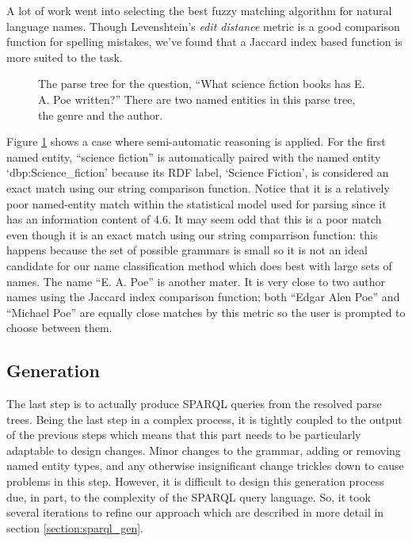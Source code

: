\documentclass[11pt]{article}
\begin{document}
{A lot of work went into selecting the best fuzzy matching algorithm for
natural language names. Though Levenshtein's {\em edit distance} metric
is a good comparison function for spelling mistakes, we've found that
a Jaccard index based function is more suited to the task. 

\begin{figure}[h!]
\caption{The parse tree for the question, 
``What science fiction books has E. A. Poe written?''
There are two named entities in this parse tree, the genre and the author.}
\label{fig:resolve}
\end{figure}

Figure \ref{fig:resolve} shows a case where semi-automatic reasoning is applied.
For the first named entity, ``science fiction'' is automatically paired with the
named entity `dbp:Science\_fiction' because its RDF label, `Science Fiction', is 
considered an exact match using our string comparison function. 
Notice that it is a relatively poor named-entity match within the statistical model
used for parsing since it has an information content of 4.6. It may seem odd that this
is a poor match even though it is an exact match using our string comparrison function:
this happens because the set of possible grammars is small so it is not an ideal
candidate for our name classification method which does best with large sets of names.
The name ``E. A. Poe'' is another mater. It is very close to two author names using the 
Jaccard index comparison function; both ``Edgar Alen Poe'' and ``Michael Poe'' are 
equally close matches by this metric so the user is prompted to choose between them.

\subsection{Generation}
\label{gen}
The last step is to actually produce SPARQL queries from the resolved parse trees.
Being the last step in a complex process, it is tightly coupled to the output of the
previous steps which means that this part needs to be particularly adaptable to design
changes. Minor changes to the grammar, adding or removing named entity types, and
any otherwise insignificant change trickles down to cause problems in this step.
However, it is difficult to design this generation process due, in part, 
to the complexity of the SPARQL query language. 
So, it took several iterations to refine our approach which are described
in more detail in section \ref{section:sparql_gen}.


}
\end{document}
